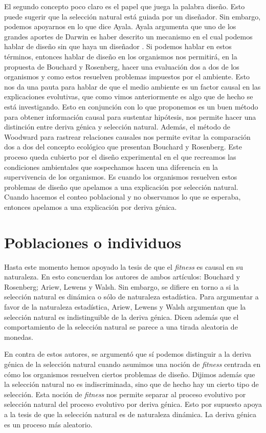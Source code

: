 El segundo concepto poco claro es el papel que juega la palabra diseño. Esto puede sugerir que la selección natural está guiada por un diseñador. Sin embargo, podemos apoyarnos en lo que dice Ayala. Ayala argumenta que uno de los grandes aportes de Darwin es haber descrito un mecanismo en el cual podemos hablar de diseño sin que haya un diseñador \cite{Ayala2004}. Si podemos hablar en estos términos, entonces hablar de diseño en los organismos nos permitirá, en la propuesta de Bouchard y Rosenberg, hacer una evaluación dos a dos de los organismos y como estos resuelven problemas impuestos por el ambiente. Esto nos da una pauta para hablar de que el medio ambiente es un factor causal en las explicaciones evolutivas, que como vimos anteriormente es algo que de hecho se está investigando. Esto en conjunción con lo que proponemos es un buen método para obtener información causal para sustentar hipótesis, nos permite hacer una distinción entre deriva génica y selección natural. Además, el método de Woodward para rastrear relaciones causales nos permite evitar la comparación dos a dos del concepto  ecológico que presentan Bouchard y Rosenberg. Este proceso queda cubierto por el diseño experimental en el que recreamos las condiciones ambientales que sospechamos hacen una diferencia en la supervivencia de los organismos. Es cuando los organismos resuelven estos problemas de diseño que apelamos a una explicación por selección natural. Cuando hacemos el conteo poblacional y no observamos lo que se esperaba, entonces apelamos a una explicación por deriva génica.

\section{Poblaciones o individuos}

\noindent Hasta este momento hemos apoyado la tesis de que el \emph{fitness} es causal en su naturaleza. En esto concuerdan los autores de ambos artículos: Bouchard y Rosenberg; Ariew, Lewens y Walsh. Sin embargo, se difiere en torno a si la selección natural es dinámica o sólo de naturaleza estadística. Para argumentar a favor de la naturaleza estadística, Ariew, Lewens y Walsh argumentan que la selección natural es indistinguible de la deriva génica. Dicen además que el comportamiento de la selección natural se parece a una tirada aleatoria de monedas.

En contra de estos autores, se argumentó que sí podemos distinguir a la deriva génica de la selección natural cuando asumimos una noción de \emph{fitness} centrada en cómo los organismos resuelven ciertos problemas de diseño. Dijimos además que la selección natural no es indiscriminada, sino que de hecho hay un cierto tipo de selección. Esta noción de \emph{fitness} nos permite separar al proceso evolutivo por selección natural del proceso evolutivo por deriva génica. Esto por supuesto apoya a la tesis de que la selección natural es de naturaleza dinámica. La deriva génica es un proceso más aleatorio.


